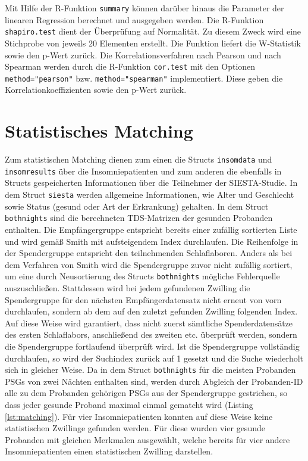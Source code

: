 Mit Hilfe der R-Funktion \texttt{summary} können darüber hinaus die Parameter der linearen Regression berechnet und ausgegeben werden. Die R-Funktion \texttt{shapiro.test} dient der Überprüfung auf Normalität. Zu diesem Zweck wird eine Stichprobe von jeweils 20 Elementen erstellt. Die Funktion liefert die W-Statistik sowie den p-Wert zurück. Die Korrelationsverfahren nach Pearson und nach Spearman werden durch die R-Funktion \texttt{cor.test} mit den Optionen \texttt{method="pearson"} bzw. \texttt{method="spearman"} implementiert. Diese geben die Korrelationkoeffizienten sowie den p-Wert zurück.


\section{Statistisches Matching}

Zum statistischen Matching dienen zum einen die Structs \texttt{insomdata} und \texttt{insomresults} über die Insomniepatienten und zum anderen die ebenfalls in Structs gespeicherten Informationen über die Teilnehmer der SIESTA-Studie. In dem Struct \texttt{siesta} werden allgemeine Informationen, wie Alter und Geschlecht sowie Status (gesund oder Art der Erkrankung) gehalten. In dem Struct \texttt{bothnights} sind die berechneten \acs{TDS}-Matrizen der gesunden Probanden enthalten. Die Empfängergruppe entspricht bereits einer zufällig sortierten Liste und wird gemäß Smith mit aufsteigendem Index durchlaufen. Die Reihenfolge in der Spendergruppe entspricht den teilnehmenden Schlaflaboren. Anders als bei dem Verfahren von Smith wird die Spendergruppe zuvor nicht zufällig sortiert, um eine durch Neusortierung des Structs \texttt{bothnights} mögliche Fehlerquelle auszuschließen. Stattdessen wird bei jedem gefundenen Zwilling die Spendergruppe für den nächsten Empfängerdatensatz nicht erneut von vorn durchlaufen, sondern ab dem auf den zuletzt gefunden Zwilling folgenden Index. Auf diese Weise wird garantiert, dass nicht zuerst sämtliche Spenderdatensätze des ersten Schlaflabors, anschließend des zweiten etc. überprüft werden, sondern die Spendergruppe fortlaufend überprüft wird. Ist die Spendergruppe vollständig durchlaufen, so wird der Suchindex zurück auf 1 gesetzt und die Suche wiederholt sich in gleicher Weise. Da in dem Struct \texttt{bothnights} für die meisten Probanden \acs{PSG}s von zwei Nächten enthalten sind, werden durch Abgleich der Probanden-ID alle zu dem Probanden gehörigen \acs{PSG}s aus der Spendergruppe gestrichen, so dass jeder gesunde Proband maximal einmal gematcht wird (Listing \ref{lst:matching}). Für vier Insomniepatienten konnten auf diese Weise keine statistischen Zwillinge gefunden werden. Für diese wurden vier gesunde Probanden mit gleichen Merkmalen ausgewählt, welche bereits für vier andere Insomniepatienten einen statistischen Zwilling darstellen.\\


